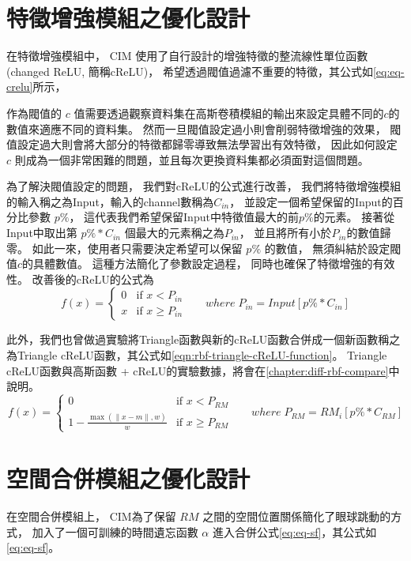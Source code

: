 \documentclass[class=NCU_thesis, crop=false]{standalone}
\begin{document}
\section{特徵增強模組之優化設計}
	在特徵增強模組中，
	CIM 使用了自行設計的增強特徵的整流線性單位函數(changed ReLU, 簡稱cReLU)，
	希望透過閥值過濾不重要的特徵，其公式如\cref{eq:eq-crelu}所示，
	
	作為閥值的 $c$ 值需要透過觀察資料集在高斯卷積模組的輸出來設定具體不同的$c$的數值來適應不同的資料集。
	然而一旦閥值設定過小則會削弱特徵增強的效果，
	閥值設定過大則會將大部分的特徵都歸零導致無法學習出有效特徵，
	因此如何設定 $c$ 則成為一個非常困難的問題，並且每次更換資料集都必須面對這個問題。

	為了解決閥值設定的問題，
	我們對cReLU的公式進行改善，
	我們將特徵增強模組的輸入稱之為Input，輸入的channel數稱為$C_{in}$，
	並設定一個希望保留的Input的百分比參數 $p\%$，
	這代表我們希望保留Input中特徵值最大的前$p\%$的元素。
	接著從Input中取出第 $p\% * C_{in}$  個最大的元素稱之為$P_{in}$，
	並且將所有小於$P_{in}$的數值歸零。
	如此一來，使用者只需要決定希望可以保留 $p\%$ 的數值，
	無須糾結於設定閥值$c$的具體數值。
	這種方法簡化了參數設定過程，
	同時也確保了特徵增強的有效性。
	改善後的cReLU的公式為\\
	\begin{equation}
	    \label{eq:eq-cReLUPercent}
	    f(x)= 
	    \begin{cases}
	        0 & \text{if  $x < P_{in}$ }\\
	        x & \text{if  $x \geq P_{in}$}
	    \end{cases} \quad where \; P_{in} = Input\left[ p\% * C_{in} \right]
	\end{equation}

	 \pagebreak
	此外，我們也曾做過實驗將Triangle函數與新的cReLU函數合併成一個新函數稱之為Triangle cReLU函數，其公式如\cref{eqn:rbf-triangle-cReLU-function}。
	Triangle cReLU函數與高斯函數 + cReLU的實驗數據，將會在\cref{chapter:diff-rbf-compare}中說明。
	\begin{equation}
      \label{eqn:rbf-triangle-cReLU-function}
      f(x)= 
      \begin{cases}
	        0 & \text{if  $x < P_{RM}$ }\\
	        1 - \frac{ \max \left( \| x-m \|, w \right)}{w} & \text{if  $x \geq P_{RM}$}
	   \end{cases} \quad where \; P_{RM} = RM_{i}\left[ p\% * C_{RM} \right]
  	\end{equation}

\section{空間合併模組之優化設計}
	在空間合併模組上，
	CIM為了保留 $RM$ 之間的空間位置關係簡化了眼球跳動的方式，
	加入了一個可訓練的時間遺忘函數 $\alpha$ 進入合併公式\cref{eq:eq-sf}，其公式如\cref{eq:eq-sf}。
		
\end{document}
